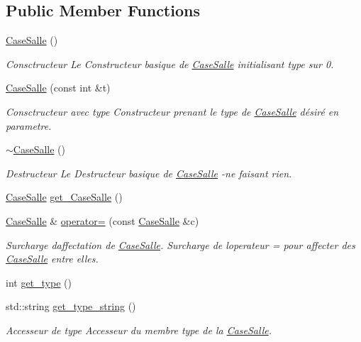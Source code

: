 \subsection*{Public Member Functions}
\begin{DoxyCompactItemize}
\item 
\hyperlink{classCaseSalle_a4252822534722fccb7d8355f79d7f244}{Case\+Salle} ()
\begin{DoxyCompactList}\small\item\em Consctructeur Le Constructeur basique de \hyperlink{classCaseSalle}{Case\+Salle} initialisant type sur 0. \end{DoxyCompactList}\item 
\hyperlink{classCaseSalle_a470fc8fdb01879fd5405392909775fe6}{Case\+Salle} (const int \&t)
\begin{DoxyCompactList}\small\item\em Consctructeur avec type Constructeur prenant le type de \hyperlink{classCaseSalle}{Case\+Salle} désiré en parametre. \end{DoxyCompactList}\item 
\hyperlink{classCaseSalle_aca43a910dbbb59bdac7af10faa5b3f39}{$\sim$\+Case\+Salle} ()
\begin{DoxyCompactList}\small\item\em Destructeur Le Destructeur basique de \hyperlink{classCaseSalle}{Case\+Salle} -\/ne faisant rien. \end{DoxyCompactList}\item 
\hyperlink{classCaseSalle}{Case\+Salle} \hyperlink{classCaseSalle_a7b85096b9782b5d52089651c69f92bee}{get\+\_\+\+Case\+Salle} ()
\item 
\hyperlink{classCaseSalle}{Case\+Salle} \& \hyperlink{classCaseSalle_a8494bda87f21c608d7da7bb510c0e525}{operator=} (const \hyperlink{classCaseSalle}{Case\+Salle} \&c)
\begin{DoxyCompactList}\small\item\em Surcharge d\textquotesingle{}affectation de \hyperlink{classCaseSalle}{Case\+Salle}. Surcharge de l\textquotesingle{}operateur = pour affecter des \hyperlink{classCaseSalle}{Case\+Salle} entre elles. \end{DoxyCompactList}\item 
int \hyperlink{classCaseSalle_a41debde3c6a1d98a752d74b13a8e69b4}{get\+\_\+type} ()
\item 
std\+::string \hyperlink{classCaseSalle_a13007bde12e9dcf3e1985473700c8fae}{get\+\_\+type\+\_\+string} ()
\begin{DoxyCompactList}\small\item\em Accesseur de {\itshape type} Accesseur du membre {\itshape type} de la \hyperlink{classCaseSalle}{Case\+Salle}. \end{DoxyCompactList}\item 

\end{DoxyCompactItemize}

